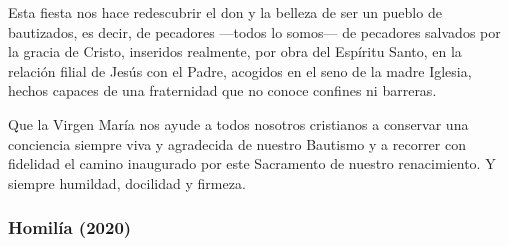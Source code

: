\begin{body}
				Esta fiesta nos hace redescubrir el don y la belleza de ser un pueblo de bautizados, es decir, de pecadores ---todos lo somos--- de pecadores salvados por la gracia de Cristo, inseridos realmente, por obra del Espíritu Santo, en la relación filial de Jesús con el Padre, acogidos en el seno de la madre Iglesia, hechos capaces de una fraternidad que no conoce confines ni barreras.
				
				Que la Virgen María nos ayude a todos nosotros cristianos a conservar una conciencia siempre viva y agradecida de nuestro Bautismo y a recorrer con fidelidad el camino inaugurado por este Sacramento de nuestro renacimiento. Y siempre humildad, docilidad y firmeza.
			\end{body}
		
		\subsubsection{Homilía (2020)} 
		
			

